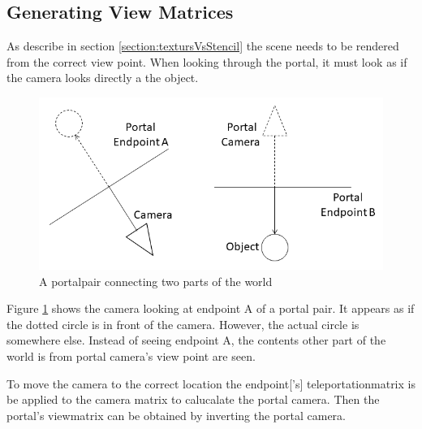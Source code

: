\subsection{Generating View Matrices}
\label{section:generatingviewmatrices}


As describe in section \ref{section:textursVsStencil} the scene needs to be rendered from the correct view point. When looking through the portal, it must look as if the camera looks directly a the object.

\begin{figure}[H]
	\includegraphics[width=\linewidth]{images/portal.png}
	\caption{A \gls{portalpair} connecting two parts of the world}
	\label{fig:portal}
\end{figure}

Figure \ref{fig:portal} shows the camera looking at endpoint A of a portal pair. It appears as if the dotted circle is in front of the camera. However, the actual circle is somewhere else. Instead of seeing endpoint A, the contents other part of the world is from portal camera's view point are seen.


To move the camera to the correct location the \gls{endpoint}['s] \gls{teleportationmatrix} is be applied to the camera matrix to calucalate the portal camera. Then the portal's \gls{viewmatrix} can be obtained by inverting the portal camera.






